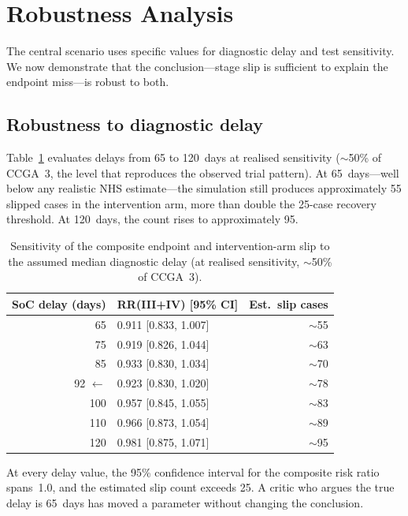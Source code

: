 \documentclass[11pt,letter]{article}
\begin{document}
\section{Robustness Analysis}
\label{sec:robustness}

The central scenario uses specific values for diagnostic delay and test
sensitivity. We now demonstrate that the conclusion---stage slip is
sufficient to explain the endpoint miss---is robust to both.

\subsection{Robustness to diagnostic delay}

Table~\ref{tab:delay_sweep} evaluates delays from 65 to 120~days at
realised sensitivity (${\sim}$50\% of CCGA~3, the level that reproduces
the observed trial pattern). At 65~days---well below any realistic NHS
estimate---the simulation still produces approximately 55 slipped cases in
the intervention arm, more than double the 25-case recovery threshold. At
120~days, the count rises to approximately 95.

\begin{table}[!ht]\centering
\caption{Sensitivity of the composite endpoint and intervention-arm slip
to the assumed median diagnostic delay (at realised sensitivity,
${\sim}$50\% of CCGA~3).}
\label{tab:delay_sweep}
\begin{tabular}{rlr}\toprule
SoC delay (days) & RR(III+IV) [95\% CI] & Est.\ slip cases \\ \midrule
65  & 0.911 [0.833, 1.007] & ${\sim}$55 \\
75  & 0.919 [0.826, 1.044] & ${\sim}$63 \\
85  & 0.933 [0.830, 1.034] & ${\sim}$70 \\
92 $\leftarrow$ & 0.923 [0.830, 1.020] & ${\sim}$78 \\
100 & 0.957 [0.845, 1.055] & ${\sim}$83 \\
110 & 0.966 [0.873, 1.054] & ${\sim}$89 \\
120 & 0.981 [0.875, 1.071] & ${\sim}$95 \\
\bottomrule
\end{tabular}
\end{table}

\noindent At every delay value, the 95\% confidence interval for the
composite risk ratio spans~1.0, and the estimated slip count exceeds 25.
A critic who argues the true delay is 65~days has moved a parameter
without changing the conclusion.
\end{document}
